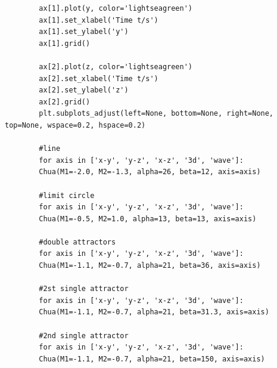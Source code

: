 \documentclass[10pt,a4paper,twoside,UTF8]{ctexart}
\begin{document}
\begin{lstlisting}
        ax[1].plot(y, color='lightseagreen')
        ax[1].set_xlabel('Time t/s')
        ax[1].set_ylabel('y')
        ax[1].grid()

        ax[2].plot(z, color='lightseagreen')
        ax[2].set_xlabel('Time t/s')
        ax[2].set_ylabel('z')
        ax[2].grid()
        plt.subplots_adjust(left=None, bottom=None, right=None, top=None, wspace=0.2, hspace=0.2)

		#line
		for axis in ['x-y', 'y-z', 'x-z', '3d', 'wave']:
		Chua(M1=-2.0, M2=-1.3, alpha=26, beta=12, axis=axis)

		#limit circle
		for axis in ['x-y', 'y-z', 'x-z', '3d', 'wave']:
        Chua(M1=-0.5, M2=1.0, alpha=13, beta=13, axis=axis)

		#double attractors
		for axis in ['x-y', 'y-z', 'x-z', '3d', 'wave']:
		Chua(M1=-1.1, M2=-0.7, alpha=21, beta=36, axis=axis)

		#2st single attractor
		for axis in ['x-y', 'y-z', 'x-z', '3d', 'wave']:
		Chua(M1=-1.1, M2=-0.7, alpha=21, beta=31.3, axis=axis)

		#2nd single attractor
		for axis in ['x-y', 'y-z', 'x-z', '3d', 'wave']:
		Chua(M1=-1.1, M2=-0.7, alpha=21, beta=150, axis=axis)
\end{lstlisting}
\end{document}

